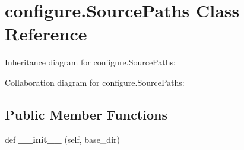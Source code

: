 \hypertarget{classconfigure_1_1_source_paths}{}\section{configure.\+Source\+Paths Class Reference}
\label{classconfigure_1_1_source_paths}


Inheritance diagram for configure.\+Source\+Paths\+:


Collaboration diagram for configure.\+Source\+Paths\+:
\subsection*{Public Member Functions}
\begin{DoxyCompactItemize}
\item 
\mbox{\label{classconfigure_1_1_source_paths_ada1bf72e95ba4a01d186a51c7e120023}} 
def {\bfseries \+\_\+\+\_\+init\+\_\+\+\_\+} (self, base\+\_\+dir)
\end{DoxyCompactItemize}
